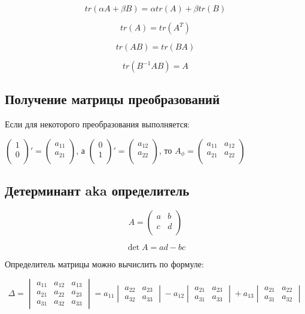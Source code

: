 \documentclass{article}
\begin{document}
$$tr(\alpha A + \beta B) = \alpha tr(A) + \beta tr(B)$$

$$tr(A) = tr(A^T)$$

$$tr(AB) = tr(BA)$$

$$tr(B^{-1}AB) = A$$

\subsection*{Получение матрицы преобразований}

Если для некоторого преобразования выполняется:

 $\begin{pmatrix}
	1\\
	0\\
\end{pmatrix}' = \begin{pmatrix}
	a_{11}\\
	a_{21}\\
\end{pmatrix}$, а 
$\begin{pmatrix}
	0\\
	1\\
\end{pmatrix}' = \begin{pmatrix}
	a_{12}\\
	a_{22}\\
\end{pmatrix}$, то 
$A_{\phi} = \begin{pmatrix}
	a_{11} & a_{12}\\
	a_{21} & a_{22}\\
\end{pmatrix}$

\subsection*{Детерминант aka определитель}
$$A = \begin{pmatrix}
	a & b\\
	c & d\\
\end{pmatrix}$$

$$\det A = ad-bc$$

Определитель матрицы можно вычислить по формуле:

$$\Delta =
\begin{vmatrix}
a_{11}&a_{12}&a_{13}\\
a_{21}&a_{22}&a_{23}\\
a_{31}&a_{32}&a_{33}
\end{vmatrix}
=a_{11}\begin{vmatrix}
a_{22}&a_{23}
\\a_{32}&a_{33}
\end{vmatrix}
-a_{12}\begin{vmatrix}
a_{21}&a_{23}
\\a_{31}&a_{33}
\end{vmatrix}
+a_{13}\begin{vmatrix}
a_{21}&a_{22}
\\a_{31}&a_{32}
\end{vmatrix}$$
\end{document}
